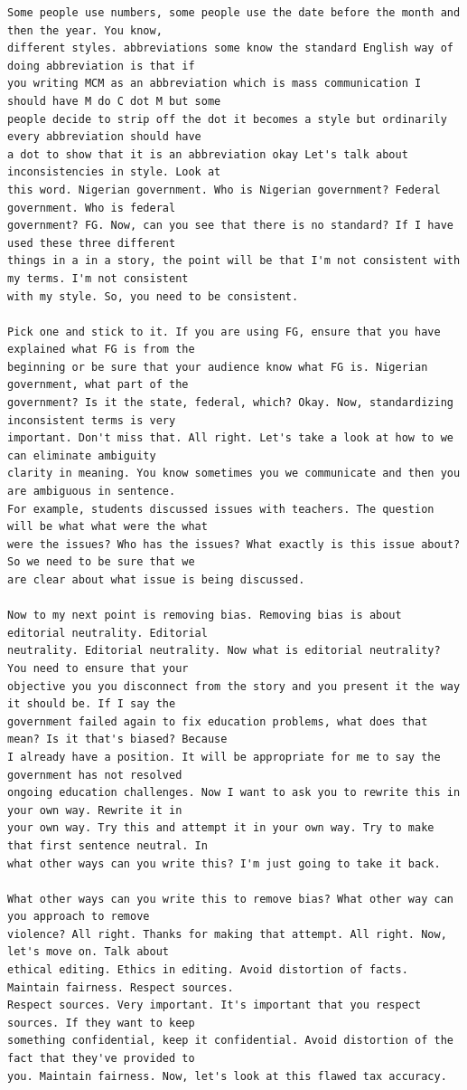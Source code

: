 {\begin{Verbatim}
Some people use numbers, some people use the date before the month and then the year. You know,
different styles. abbreviations some know the standard English way of doing abbreviation is that if
you writing MCM as an abbreviation which is mass communication I should have M do C dot M but some
people decide to strip off the dot it becomes a style but ordinarily every abbreviation should have
a dot to show that it is an abbreviation okay Let's talk about inconsistencies in style. Look at
this word. Nigerian government. Who is Nigerian government? Federal government. Who is federal
government? FG. Now, can you see that there is no standard? If I have used these three different
things in a in a story, the point will be that I'm not consistent with my terms. I'm not consistent
with my style. So, you need to be consistent.

Pick one and stick to it. If you are using FG, ensure that you have explained what FG is from the
beginning or be sure that your audience know what FG is. Nigerian government, what part of the
government? Is it the state, federal, which? Okay. Now, standardizing inconsistent terms is very
important. Don't miss that. All right. Let's take a look at how to we can eliminate ambiguity
clarity in meaning. You know sometimes you we communicate and then you are ambiguous in sentence.
For example, students discussed issues with teachers. The question will be what what were the what
were the issues? Who has the issues? What exactly is this issue about? So we need to be sure that we
are clear about what issue is being discussed.

Now to my next point is removing bias. Removing bias is about editorial neutrality. Editorial
neutrality. Editorial neutrality. Now what is editorial neutrality? You need to ensure that your
objective you you disconnect from the story and you present it the way it should be. If I say the
government failed again to fix education problems, what does that mean? Is it that's biased? Because
I already have a position. It will be appropriate for me to say the government has not resolved
ongoing education challenges. Now I want to ask you to rewrite this in your own way. Rewrite it in
your own way. Try this and attempt it in your own way. Try to make that first sentence neutral. In
what other ways can you write this? I'm just going to take it back.

What other ways can you write this to remove bias? What other way can you approach to remove
violence? All right. Thanks for making that attempt. All right. Now, let's move on. Talk about
ethical editing. Ethics in editing. Avoid distortion of facts. Maintain fairness. Respect sources.
Respect sources. Very important. It's important that you respect sources. If they want to keep
something confidential, keep it confidential. Avoid distortion of the fact that they've provided to
you. Maintain fairness. Now, let's look at this flawed tax accuracy.


\end{Verbatim}}
